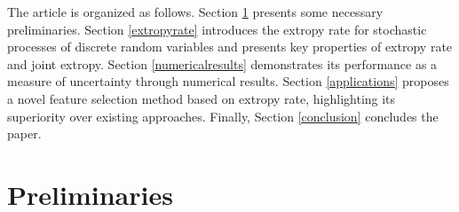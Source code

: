 \documentclass[pdflatex]{sn-jnl}%
\theoremstyle{thmstyleone}
\theoremstyle{thmstyletwo}%
\theoremstyle{thmstylethree}%
\begin{document}
The article is organized as follows. Section \ref{prel} presents some necessary preliminaries. Section \ref{extropyrate} introduces the extropy rate for stochastic processes of discrete random variables and presents key properties of extropy rate and joint extropy. Section \ref{numericalresults} demonstrates its performance as a measure of uncertainty through numerical results. Section \ref{applications} proposes a novel feature selection method based on extropy rate, highlighting its superiority over existing approaches. Finally, Section \ref{conclusion} concludes the paper.




\section{Preliminaries} \label{prel}
\end{document}
